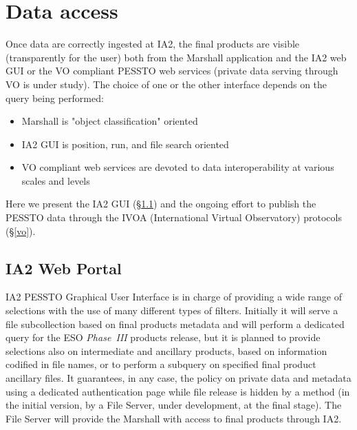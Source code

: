 \section{Data access}\label{dataaccess}

Once data are correctly ingested at IA2, the final products are visible (transparently for the user) both from the Marshall application and the IA2 web GUI or the VO compliant PESSTO web services (private data serving through VO is under study). The choice of one or the other interface depends on the query being performed:
\begin{itemize}[noitemsep,nolistsep]
	\item Marshall is "object classification" oriented
	\item {}IA2 GUI is position, run, and file search oriented
	\item{} VO compliant web services are devoted to data interoperability at various scales and levels
\end{itemize}
Here we present the IA2 GUI (\S \ref{ia2web}) and the ongoing effort to publish the PESSTO data through the IVOA (International Virtual Observatory) protocols (\S \ref{vo}).

\subsection{IA2 Web Portal}\label{ia2web}

IA2 PESSTO Graphical User Interface is in charge of providing a wide range of selections with the use of many different types of filters. Initially it will serve a file subcollection based on final products metadata and will perform a dedicated query for the ESO \textit{Phase~III} products release, but it is planned to provide selections also on intermediate and ancillary products, based on information codified in file names, or to perform a subquery on specified final product ancillary files. It guarantees, in any case, the policy on private data and metadata using a dedicated authentication page while file release is hidden by a method (in the initial version, by a File Server, under development, at the final stage). The File Server will provide the Marshall with access to final products through IA2.

